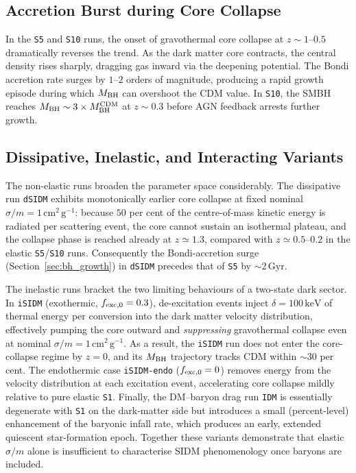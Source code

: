 \documentclass[fleqn,usenatbib]{mnras}
\newcommand{\code}[1]{\texttt{#1}}
\newcommand{\sigmam}{\sigma/m}
\newcommand{\Gyr}{\,\mathrm{Gyr}}
\newcommand{\MBH}{M_{\rm BH}}
\begin{document}
\subsection{Accretion Burst during Core Collapse}

In the \code{S5} and \code{S10} runs, the onset of gravothermal
core collapse at $z \sim 1$--$0.5$ dramatically reverses the trend.
As the dark matter core contracts, the central density rises sharply,
dragging gas inward via the deepening potential.  The Bondi accretion
rate surges by $1$--$2$ orders of magnitude, producing a rapid growth
episode during which $\MBH$ can overshoot the CDM value.  In
\code{S10}, the SMBH reaches $\MBH \sim 3 \times \MBH^{\rm CDM}$ at
$z \sim 0.3$ before AGN feedback arrests further growth.

\subsection{Dissipative, Inelastic, and Interacting Variants}

The non-elastic runs broaden the parameter space considerably.  The
dissipative run \code{dSIDM} exhibits monotonically earlier core
collapse at fixed nominal $\sigmam = 1\,\mathrm{cm^2\,g^{-1}}$:
because $50$ per cent of the centre-of-mass kinetic energy is
radiated per scattering event, the core cannot sustain an
isothermal plateau, and the collapse phase is reached already at
$z\simeq 1.3$, compared with $z\simeq 0.5$--$0.2$ in the elastic
\code{S5}/\code{S10} runs.  Consequently the Bondi-accretion surge
(Section~\ref{sec:bh_growth}) in \code{dSIDM} precedes that of
\code{S5} by $\sim 2\Gyr$.

The inelastic runs bracket the two limiting behaviours of a
two-state dark sector.  In \code{iSIDM} (exothermic,
$f_{\rm exc,0}=0.3$), de-excitation events inject
$\delta = 100\,\mathrm{keV}$ of thermal energy per conversion into
the dark matter velocity distribution, effectively pumping the
core outward and \emph{suppressing} gravothermal collapse even at
nominal $\sigmam = 1\,\mathrm{cm^2\,g^{-1}}$.  As a result, the
\code{iSIDM} run does not enter the core-collapse regime by $z=0$,
and its $\MBH$ trajectory tracks CDM within $\sim 30$ per cent.
The endothermic case \code{iSIDM-endo} ($f_{\rm exc,0}=0$) removes
energy from the velocity distribution at each excitation event,
accelerating core collapse mildly relative to pure elastic
\code{S1}.  Finally, the DM--baryon drag run \code{IDM} is
essentially degenerate with \code{S1} on the dark-matter side but
introduces a small (percent-level) enhancement of the baryonic
infall rate, which produces an early, extended quiescent
star-formation epoch.  Together these variants demonstrate that
elastic $\sigmam$ alone is insufficient to characterise SIDM
phenomenology once baryons are included.
\end{document}

